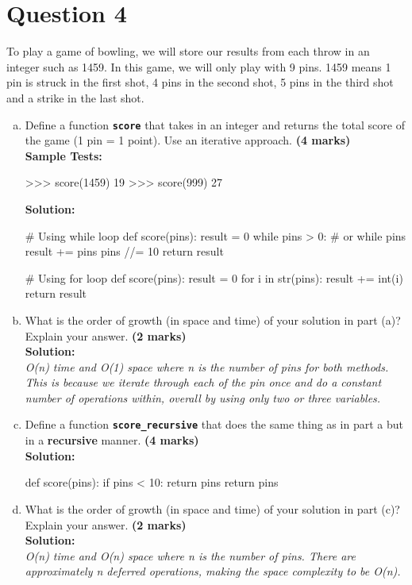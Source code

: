 \section{Question 4}
To play a game of bowling, we will store our results from each throw in an integer such
as 1459. In this game, we will only play with 9 pins. 1459 means 1 pin is struck in the
first shot, 4 pins in the second shot, 5 pins in the third shot and a strike in the last shot.
\begin{enumerate}[(a)]
\item Define a function \texttt{\bfseries score} that takes in an integer and returns the total score of the
game (1 pin = 1 point). Use an iterative approach. \textbf{(4 marks)} \\
\textbf{Sample Tests:}
\begin{python}
>>> score(1459)
19
>>> score(999)
27
\end{python}
\textbf{Solution:}
\begin{python}
# Using while loop
def score(pins):
    result = 0
    while pins > 0: # or while pins
        result += pins %
        pins //= 10
    return result

# Using for loop
def score(pins):
    result = 0
    for i in str(pins):
        result += int(i)
    return result
\end{python}

\item What is the order of growth (in space and time) of your solution in part (a)? Explain
your answer. \textbf{(2 marks)} \\
\textbf{Solution:} \\
\textit{O(n) time and O(1) space where n is the number of pins for both methods. This is because we iterate through 
each of the pin once and do a constant number of operations within, overall by using only two or three variables.}

\item Define a function \texttt{\bfseries score\_recursive} that does the same thing as in part a but in a
\textbf{recursive} manner. \textbf{(4 marks)} \\
\textbf{Solution:}
\begin{python}
def score(pins):
    if pins < 10:
        return pins
    return pins %
\end{python}

\item What is the order of growth (in space and time) of your solution in part (c)? Explain
your answer. \textbf{(2 marks)} \\
\textbf{Solution:} \\
\textit{O(n) time and O(n) space where n is the number of pins. There are approximately n deferred operations, 
making the space complexity to be O(n).}


\end{enumerate}
